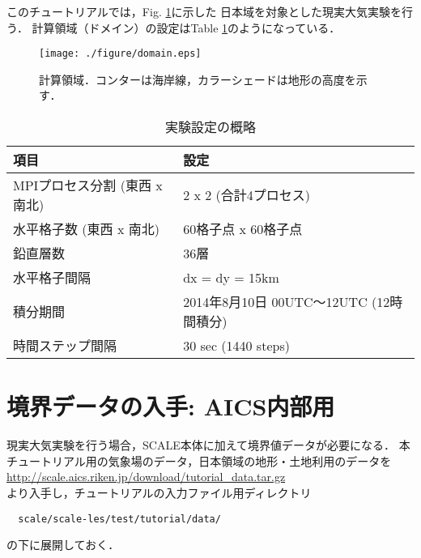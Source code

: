 
このチュートリアルでは，Fig. \ref{fig:domain}に示した
日本域を対象とした現実大気実験を行う．
計算領域（ドメイン）の設定はTable \ref{tab:grids}のようになっている．

\begin{figure}[h]
\begin{center}
  \texttt{[image: ./figure/domain.eps]}\\
  \caption{計算領域．コンターは海岸線，カラーシェードは地形の高度を示す．}
  \label{fig:domain}
\end{center}
\end{figure}

\begin{table}[h]
\begin{center}
  \caption{実験設定の概略}
  \label{tab:grids}
  \begin{tabularx}{150mm}{|l|X|} \hline
    \rowcolor[gray]{0.9} 項目 & 設定 \\ \hline
    MPIプロセス分割 (東西 x 南北) & 2 x 2 (合計4プロセス) \\ \hline
    水平格子数 (東西 x 南北) & 60格子点 x 60格子点 \\ \hline
    鉛直層数                 & 36層                  \\ \hline
    水平格子間隔             & dx = dy = 15km       \\ \hline
    積分期間 & 2014年8月10日 00UTC～12UTC (12時間積分) \\ \hline
    時間ステップ間隔 & 30 sec (1440 steps) \\ \hline
  \end{tabularx}
\end{center}
\end{table}

\section{境界データの入手: AICS内部用}

現実大気実験を行う場合，SCALE本体に加えて境界値データが必要になる．
本チュートリアル用の気象場のデータ，日本領域の地形・土地利用のデータを\\
 \url{http://scale.aics.riken.jp/download/tutorial_data.tar.gz}\\
より入手し，チュートリアルの入力ファイル用ディレクトリ
\begin{verbatim}
  scale/scale-les/test/tutorial/data/
\end{verbatim}
の下に展開しておく．

